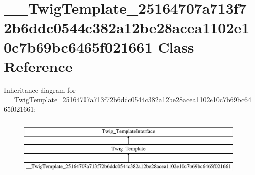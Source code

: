 \hypertarget{class_____twig_template__25164707a713f72b6ddc0544c382a12be28acea1102e10c7b69bc6465f021661}{}\section{\+\_\+\+\_\+\+Twig\+Template\+\_\+25164707a713f72b6ddc0544c382a12be28acea1102e10c7b69bc6465f021661 Class Reference}
\label{class_____twig_template__25164707a713f72b6ddc0544c382a12be28acea1102e10c7b69bc6465f021661}
Inheritance diagram for \+\_\+\+\_\+\+Twig\+Template\+\_\+25164707a713f72b6ddc0544c382a12be28acea1102e10c7b69bc6465f021661\+:\begin{figure}[H]
\begin{center}
\leavevmode
\includegraphics[height=3.000000cm]{class_____twig_template__25164707a713f72b6ddc0544c382a12be28acea1102e10c7b69bc6465f021661}
\end{center}
\end{figure}
